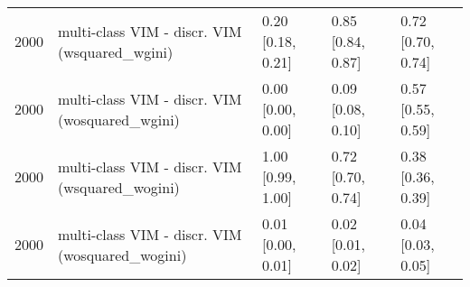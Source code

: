 \begin{table}[ht]
\begin{tabular}{rllll}
  2000 & multi-class VIM - discr. VIM (wsquared\_wgini) & 0.20 [0.18, 0.21] & 0.85 [0.84, 0.87] & 0.72 [0.70, 0.74] \\ 
  2000 & multi-class VIM - discr. VIM (wosquared\_wgini) & 0.00 [0.00, 0.00] & 0.09 [0.08, 0.10] & 0.57 [0.55, 0.59] \\ 
  2000 & multi-class VIM - discr. VIM (wsquared\_wogini) & 1.00 [0.99, 1.00] & 0.72 [0.70, 0.74] & 0.38 [0.36, 0.39] \\ 
  2000 & multi-class VIM - discr. VIM (wosquared\_wogini) & 0.01 [0.00, 0.01] & 0.02 [0.01, 0.02] & 0.04 [0.03, 0.05] \\ 
   \hline
\end{tabular}
\end{table}
